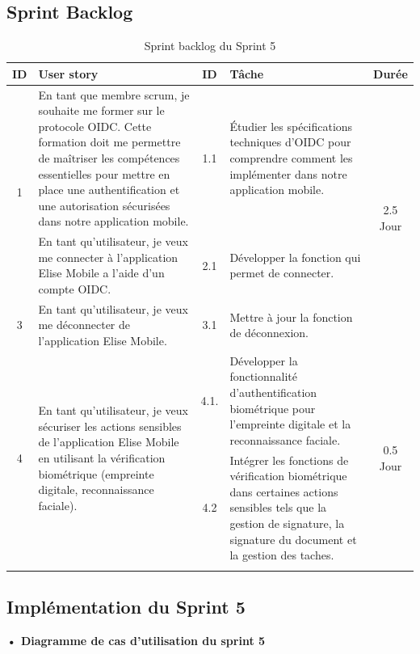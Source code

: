 \subsection{Sprint Backlog}


\begin{adjustwidth}{-1cm}{}
    
    \begin{longtable}{|c|p{6cm}|c|p{6cm}|c|}
      \hline
      \textbf{ID} & \textbf{User story} & \textbf{ID}  & \textbf{Tâche} & \textbf{Durée} \\
      \hline
      \multirow{2}{*}{1} & En tant que membre scrum, je souhaite me former sur le protocole OIDC. Cette formation doit me permettre de maîtriser les compétences essentielles pour mettre en place une authentification et une autorisation sécurisées dans notre application mobile.
      & 1.1 & Étudier les spécifications techniques d'OIDC pour comprendre comment les implémenter dans notre application mobile. & \multirow{3}{*}{2.5 Jour} \\
      \cline{1-5}
      \multirow{1}{*}{2} & En tant qu'utilisateur, je veux me connecter à l'application Elise Mobile a l'aide d'un compte OIDC. & 2.1 & Développer la fonction qui permet de connecter. &  \multirow{1}{*}{2.5 Jour} \\
      \cline{1-5}
      \multirow{1}{*}{3} & En tant qu'utilisateur, je veux me déconnecter de l'application Elise Mobile. & 3.1 & Mettre à jour la fonction de déconnexion. & \multirow{1}{*}{0.5 Jour} \\
      \cline{1-5}
      \multirow{2}{*}{4} & \multirow{2}{6cm}{En tant qu'utilisateur, je veux sécuriser les actions sensibles de l'application Elise Mobile en utilisant la vérification biométrique (empreinte digitale, reconnaissance faciale).} & 4.1.& Développer la fonctionnalité d'authentification biométrique pour l'empreinte digitale et la reconnaissance faciale. & \multirow{2}{*}{0.5 Jour} \\
      \cline{3-4}
      & & 4.2 & Intégrer les fonctions de vérification biométrique dans certaines actions sensibles tels que la gestion de signature, la signature du document et la gestion des taches. & \\
      \cline{1-5}
  \hline
  \caption{Sprint backlog du Sprint 5}
  \label{tab:sprint-backlog-5}
\end{longtable}
\end{adjustwidth}


\subsection{Implémentation du Sprint 5}
\textbf{•	Diagramme de cas d'utilisation du sprint 5}

